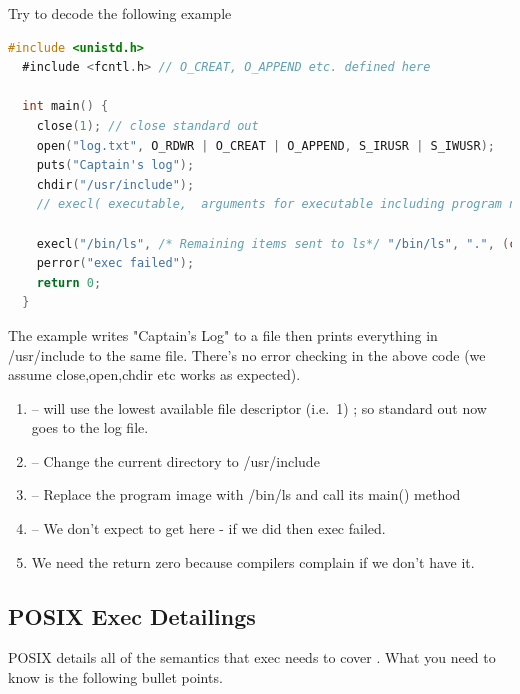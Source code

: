 Try to decode the following example

\begin{lstlisting}[language=C]
  #include <unistd.h>
  #include <fcntl.h> // O_CREAT, O_APPEND etc. defined here

  int main() {
    close(1); // close standard out
    open("log.txt", O_RDWR | O_CREAT | O_APPEND, S_IRUSR | S_IWUSR);
    puts("Captain's log");
    chdir("/usr/include");
    // execl( executable,  arguments for executable including program name and NULL at the end)

    execl("/bin/ls", /* Remaining items sent to ls*/ "/bin/ls", ".", (char *) NULL); // "ls ."
    perror("exec failed");
    return 0;
  }
\end{lstlisting}

The example writes "Captain's Log" to a file then prints everything in /usr/include to the same file.
There's no error checking in the above code (we assume close,open,chdir etc works as expected).

\begin{enumerate}
\item {} -- will use the lowest available file descriptor (i.e.~1) ; so standard out now goes to the log file.
\item {} -- Change the current directory to /usr/include
\item {} -- Replace the program image with /bin/ls and call its main() method
\item {} -- We don't expect to get here - if we did then exec failed.
\item We need the return zero because compilers complain if we don't have it.
\end{enumerate}

\subsection{POSIX Exec Detailings}

POSIX details all of the semantics that exec needs to cover \cite{exec_2018}.
What you need to know is the following bullet points.

